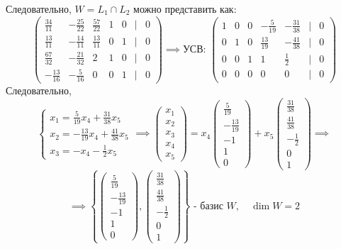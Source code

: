 \documentclass[a4paper]{article}
\newcommand{\mat}[1]{\begin{pmatrix} #1 \end{pmatrix}}
\newcommand{\case}[1]{\begin{cases} #1 \end{cases}}
\begin{document}
\begin{enumerate}
\begin{enumerate}
        Следовательно, $W = L_1 \cap L_2$ можно представить как:
        $$\mat{\frac{34}{11}&-\frac{25}{22}&\frac{57}{22}&1&0&|&0\\
        \frac{13}{11}&-\frac{14}{11}&\frac{13}{11}&0&1&|&0\\
        \frac{67}{32}&-\frac{21}{32}&2&1&0&|&0\\
        -\frac{13}{16}&-\frac{5}{16}&0&0&1&|&0
        }\implies \text{УСВ: }\begin{pmatrix}
            1 & 0 & 0 & -\frac{5}{19} & -\frac{31}{38} &|&0 \\
            0 & 1 & 0 & \frac{13}{19} & -\frac{41}{38} & |&0 \\
            0 & 0 & 1 & 1 & \frac{1}{2} &|& 0 \\
            0 & 0 & 0 & 0 & 0 & |&0
            \end{pmatrix}$$
        Следовательно, 
        $$\case{
            x_1 = \frac{5}{19}x_4+\frac{31}{38}x_5\\
            x_2 = -\frac{13}{19}x_4+\frac{41}{38}x_5\\
            x_3 = -x_4-\frac{1}{2}x_5
        }\implies
        \begin{pmatrix}
        x_1 \\
        x_2 \\
        x_3 \\
        x_4 \\
        x_5
        \end{pmatrix} = 
        x_4 \begin{pmatrix}
        \frac{5}{19} \\
        -\frac{13}{19} \\
        -1 \\
        1 \\
        0
        \end{pmatrix} + 
        x_5 \begin{pmatrix}
        \frac{31}{38} \\
        \frac{41}{38} \\
        -\frac{1}{2} \\
        0 \\
        1
        \end{pmatrix}
        \implies$$
    $$\implies\left\{\begin{pmatrix}
        \frac{5}{19} \\
        -\frac{13}{19} \\
        -1 \\
        1 \\
        0
        \end{pmatrix},\begin{pmatrix}
            \frac{31}{38} \\
            \frac{41}{38} \\
            -\frac{1}{2} \\
            0 \\
            1
            \end{pmatrix}\right\} \text{ - базис $W$}, \quad \dim W = 2$$
    

\end{enumerate}
\end{enumerate}
\end{document}
